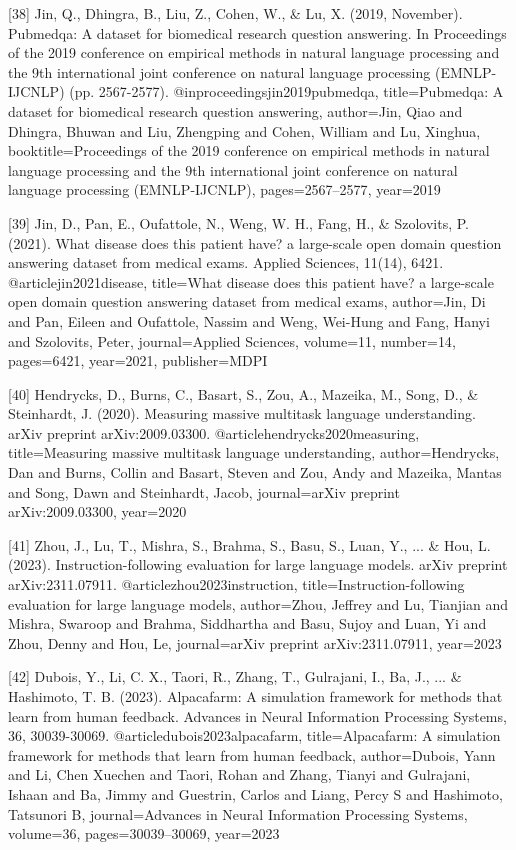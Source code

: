 \documentclass{article}
\begin{document}
{[38] Jin, Q., Dhingra, B., Liu, Z., Cohen, W., & Lu, X. (2019, November). Pubmedqa: A dataset for biomedical research question answering. In Proceedings of the 2019 conference on empirical methods in natural language processing and the 9th international joint conference on natural language processing (EMNLP-IJCNLP) (pp. 2567-2577).
@inproceedings{jin2019pubmedqa,
  title={Pubmedqa: A dataset for biomedical research question answering},
  author={Jin, Qiao and Dhingra, Bhuwan and Liu, Zhengping and Cohen, William and Lu, Xinghua},
  booktitle={Proceedings of the 2019 conference on empirical methods in natural language processing and the 9th international joint conference on natural language processing (EMNLP-IJCNLP)},
  pages={2567--2577},
  year={2019}
}

[39] Jin, D., Pan, E., Oufattole, N., Weng, W. H., Fang, H., & Szolovits, P. (2021). What disease does this patient have? a large-scale open domain question answering dataset from medical exams. Applied Sciences, 11(14), 6421.
@article{jin2021disease,
  title={What disease does this patient have? a large-scale open domain question answering dataset from medical exams},
  author={Jin, Di and Pan, Eileen and Oufattole, Nassim and Weng, Wei-Hung and Fang, Hanyi and Szolovits, Peter},
  journal={Applied Sciences},
  volume={11},
  number={14},
  pages={6421},
  year={2021},
  publisher={MDPI}
}

[40] Hendrycks, D., Burns, C., Basart, S., Zou, A., Mazeika, M., Song, D., & Steinhardt, J. (2020). Measuring massive multitask language understanding. arXiv preprint arXiv:2009.03300.
@article{hendrycks2020measuring,
  title={Measuring massive multitask language understanding},
  author={Hendrycks, Dan and Burns, Collin and Basart, Steven and Zou, Andy and Mazeika, Mantas and Song, Dawn and Steinhardt, Jacob},
  journal={arXiv preprint arXiv:2009.03300},
  year={2020}
}

[41] Zhou, J., Lu, T., Mishra, S., Brahma, S., Basu, S., Luan, Y., ... & Hou, L. (2023). Instruction-following evaluation for large language models. arXiv preprint arXiv:2311.07911.
@article{zhou2023instruction,
  title={Instruction-following evaluation for large language models},
  author={Zhou, Jeffrey and Lu, Tianjian and Mishra, Swaroop and Brahma, Siddhartha and Basu, Sujoy and Luan, Yi and Zhou, Denny and Hou, Le},
  journal={arXiv preprint arXiv:2311.07911},
  year={2023}
}

[42] Dubois, Y., Li, C. X., Taori, R., Zhang, T., Gulrajani, I., Ba, J., ... & Hashimoto, T. B. (2023). Alpacafarm: A simulation framework for methods that learn from human feedback. Advances in Neural Information Processing Systems, 36, 30039-30069.
@article{dubois2023alpacafarm,
  title={Alpacafarm: A simulation framework for methods that learn from human feedback},
  author={Dubois, Yann and Li, Chen Xuechen and Taori, Rohan and Zhang, Tianyi and Gulrajani, Ishaan and Ba, Jimmy and Guestrin, Carlos and Liang, Percy S and Hashimoto, Tatsunori B},
  journal={Advances in Neural Information Processing Systems},
  volume={36},
  pages={30039--30069},
  year={2023}
}

}
\end{document}
